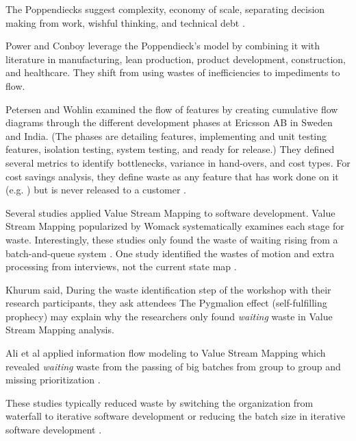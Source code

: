 The Poppendiecks suggest  complexity, economy of scale, separating decision making from work, wishful thinking, and technical debt \cite{PoppendieckResultsNotPoint}.

Power and Conboy leverage the Poppendieck's model by combining it with literature in manufacturing, lean production, product development, construction, and healthcare. They shift from using wastes of inefficiencies to impediments to flow. \cite{PowerImpediments}

Petersen and Wohlin examined the flow of features by creating cumulative flow diagrams through the different development phases at Ericsson AB in Sweden and India. (The phases are detailing features, implementing and unit testing features, isolation testing, system testing, and ready for release.) They defined several metrics to identify bottlenecks, variance in hand-overs, and cost types. For cost savings analysis, they define waste as any feature that has work done on it (e.g. ) but is never released to a customer \cite{Petersen2011}.

Several studies applied Value Stream Mapping to software development. Value Stream Mapping popularized by Womack systematically examines each stage for waste. Interestingly, these studies only found the waste of waiting rising from a batch-and-queue system \cite{Ali2016, Khurum2014, Mujtaba2010}. One study identified the wastes of motion and extra processing from interviews, not the current state map \cite{Mujtaba2010}.

Khurum said,  During the waste identification step of the workshop with their research participants, they ask attendees  \cite{Khurum2014} The Pygmalion effect (self-fulfilling prophecy) may explain why the researchers only found \textit{waiting} waste in Value Stream Mapping analysis.

Ali et al applied information flow modeling to Value Stream Mapping which revealed \textit{waiting} waste from the passing of big batches from group to group and missing prioritization \cite{Ali2016}.

These studies typically reduced waste by switching the organization from waterfall to iterative software development or reducing the batch size in iterative software development \cite{Ali2016, Khurum2014, Mujtaba2010}.


